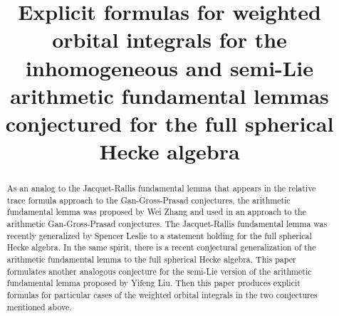 \documentclass[final,twoside]{mitthesis}
\begin{document}
\title{Explicit formulas for weighted orbital integrals for the
  inhomogeneous and semi-Lie arithmetic fundamental lemmas
  conjectured for the full spherical Hecke algebra}



\maketitle

\begin{abstract}
  As an analog to the Jacquet-Rallis fundamental lemma that appears in the
  relative trace formula approach to the Gan-Gross-Prasad conjectures,
  the arithmetic fundamental lemma was proposed by Wei Zhang and used in an approach
  to the arithmetic Gan-Gross-Prasad conjectures.
  The Jacquet-Rallis fundamental lemma was recently generalized by Spencer Leslie
  to a statement holding for the full spherical Hecke algebra.
  In the same spirit, there is a recent conjectural generalization
  of the arithmetic fundamental lemma to the full spherical Hecke algebra.
  This paper formulates another analogous conjecture for the semi-Lie version
  of the arithmetic fundamental lemma proposed by Yifeng Liu.
  Then this paper produces explicit formulas for particular cases
  of the weighted orbital integrals in the two conjectures mentioned above.
\end{abstract}

\singlespacing



\tableofcontents
\listoffigures
\listoftables
\listoftheorems[numwidth=3em]
\doublespacing






















\singlespacing
\printbibliography[title=References,heading=bibintoc]
\doublespacing

\appendix

\end{document}
